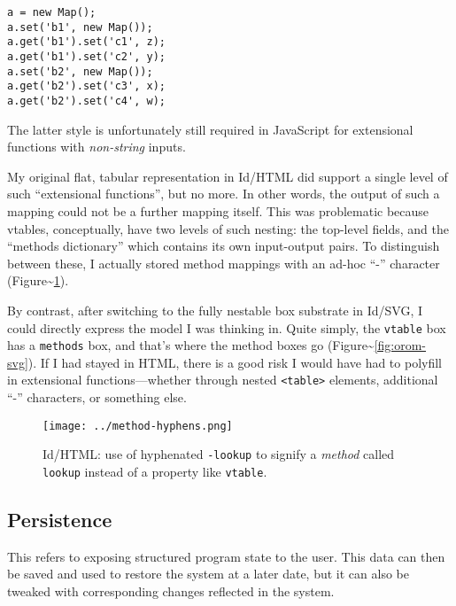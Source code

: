 \begin{lstlisting}
a = new Map();
a.set('b1', new Map());
a.get('b1').set('c1', z);
a.get('b1').set('c2', y);
a.set('b2', new Map());
a.get('b2').set('c3', x);
a.get('b2').set('c4', w);
\end{lstlisting}

The latter style is unfortunately still required in JavaScript for
extensional functions with \emph{non-string} inputs.

My original flat, tabular representation in Id{}/HTML did support a
single level of such ``extensional functions'', but no more. In other
words, the output of such a mapping could not be a further mapping
itself. This was problematic because vtables, conceptually, have two
levels of such nesting: the top-level fields, and the ``methods
dictionary'' which contains its own input-output pairs. To distinguish
between these, I actually stored method mappings with an ad-hoc ``-''
character (Figure\textasciitilde{}\ref{fig:method-hyphens}).

By contrast, after switching to the fully nestable box substrate in
Id{}/SVG, I could directly express the model I was thinking in. Quite
simply, the \texttt{vtable} box has a \texttt{methods} box, and that's
where the method boxes go (Figure\textasciitilde{}\ref{fig:orom-svg}).
If I had stayed in HTML, there is a good risk I would have had to
polyfill in extensional functions---whether through nested
\texttt{\textless{}table\textgreater{}} elements, additional ``-''
characters, or something else.

\begin{figure}[h]
  \centering
  \texttt{[image: ../method-hyphens.png]}
  \caption{Id{}/HTML: use of hyphenated \texttt{-lookup} to signify a \emph{method} called
           \texttt{lookup} instead of a property like \texttt{vtable}. \label{fig:method-hyphens}}
\end{figure}

\hypertarget{persistence}{%
\subsection{Persistence}\label{persistence}}

This refers to exposing structured program state to the user. This data
can then be saved and used to restore the system at a later date, but it
can also be tweaked with corresponding changes reflected in the system.

